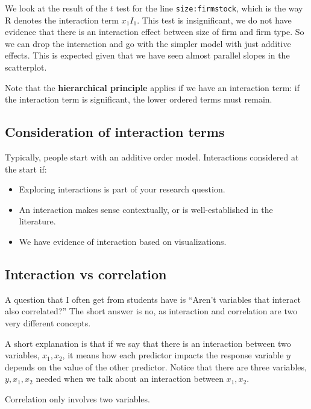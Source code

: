 \documentclass[
]{book}
\providecommand{\tightlist}{%
  \setlength{\itemsep}{0pt}\setlength{\parskip}{0pt}}
\begin{document}
We look at the result of the \(t\) test for the line \texttt{size:firmstock}, which is the way R denotes the interaction term \(x_1 I_1\). This test is insignificant, we do not have evidence that there is an interaction effect between size of firm and firm type. So we can drop the interaction and go with the simpler model with just additive effects. This is expected given that we have seen almost parallel slopes in the scatterplot.

Note that the \textbf{hierarchical principle} applies if we have an interaction term: if the interaction term is significant, the lower ordered terms must remain.

\hypertarget{consideration-of-interaction-terms}{%
\subsection{Consideration of interaction terms}\label{consideration-of-interaction-terms}}

Typically, people start with an additive order model. Interactions considered at the start if:

\begin{itemize}
\tightlist
\item
  Exploring interactions is part of your research question.
\item
  An interaction makes sense contextually, or is well-established in the literature.
\item
  We have evidence of interaction based on visualizations.
\end{itemize}

\hypertarget{interaction-vs-correlation}{%
\subsection{Interaction vs correlation}\label{interaction-vs-correlation}}

A question that I often get from students have is ``Aren't variables that interact also correlated?'' The short answer is no, as interaction and correlation are two very different concepts.

A short explanation is that if we say that there is an interaction between two variables, \(x_1, x_2\), it means how each predictor impacts the response variable \(y\) depends on the value of the other predictor. Notice that there are three variables, \(y, x_1, x_2\) needed when we talk about an interaction between \(x_1, x_2\).

Correlation only involves two variables.
\end{document}
